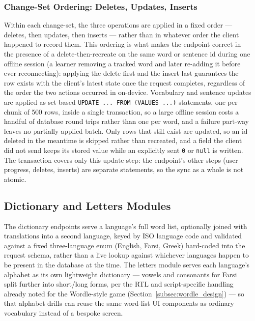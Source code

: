         \subsubsection{Change-Set Ordering: Deletes, Updates, Inserts}
        \begin{sloppypar}
        Within each change-set, the three operations are applied in a fixed order --- deletes, then updates, then inserts --- rather than in whatever order the client happened to record them. This ordering is what makes the endpoint correct in the presence of a delete-then-recreate on the same word or sentence id during one offline session (a learner removing a tracked word and later re-adding it before ever reconnecting): applying the delete first and the insert last guarantees the row exists with the client's latest state once the request completes, regardless of the order the two actions occurred in on-device. Vocabulary and sentence updates are applied as set-based \texttt{UPDATE~...~FROM~(VALUES~...)} statements, one per chunk of 500 rows, inside a single transaction, so a large offline session costs a handful of database round trips rather than one per word, and a failure part-way leaves no partially applied batch. Only rows that still exist are updated, so an id deleted in the meantime is skipped rather than recreated, and a field the client did not send keeps its stored value while an explicitly sent \texttt{0} or \texttt{null} is written. The transaction covers only this update step: the endpoint's other steps (user progress, deletes, inserts) are separate statements, so the sync as a whole is not atomic.
        \end{sloppypar}

    \subsection{Dictionary and Letters Modules}
    \label{subsec:dictionary_impl}
    The dictionary endpoints serve a language's full word list, optionally joined with translations into a second language, keyed by ISO language code and validated against a fixed three-language enum (English, Farsi, Greek) hard-coded into the request schema, rather than a live lookup against whichever languages happen to be present in the database at the time. The letters module serves each language's alphabet as its own lightweight dictionary --- vowels and consonants for Farsi split further into short/long forms, per the RTL and script-specific handling already noted for the Wordle-style game (Section~\ref{subsec:wordle_design}) --- so that alphabet drills can reuse the same word-list UI components as ordinary vocabulary instead of a bespoke screen.

